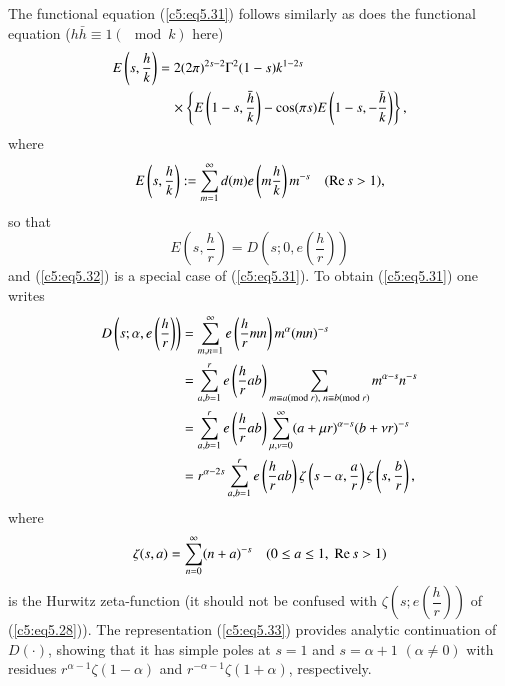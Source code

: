 The functional equation (\ref{c5:eq5.31}) follows similarly as does
the functional equation ($h \bar{h} \equiv 1 (\mod k)$ here) 
\begin{align}
E \left(s , \frac{h}{k} \right) &= 2 (2 \pi)^{2s - 2} \Gamma^2 (1-s)
k^{1-2s}\notag\\
&\quad \times \left\{ E \left(1-s, \frac{\bar{h}}{k} \right) - \cos
(\pi s) E \left(1-s, - \frac{\bar{h}}{k} \right)\right\},
\label{c5:eq5.32} 
\end{align}
where
$$
E \left(s, \frac{h}{k} \right) : = \sum\limits^\infty_{m=1} d(m) e
\left(m\frac{h}{k} \right) m^{-s} \quad (\operatorname{Re} s > 1),  
$$
so that
$$
E \left(s, \frac{h}{r} \right) = D \left(s; 0, e \left(\frac{h}{r}
\right) \right)  
$$
and (\ref{c5:eq5.32}) is a special case of (\ref{c5:eq5.31}). To
obtain (\ref{c5:eq5.31}) one writes  
\begin{align}
 D \left(s; \alpha, e \left(\frac{h}{r} \right) \right) & =
 \sum\limits^\infty_{m,n=1} e \left(\frac{h}{r}mn \right) m^{\alpha}
 (mn)^{-s} \label{c5:eq5.33}\\ 
&= \sum\limits^r_{a,b=1} e \left(\frac{h}{r} ab \right)
 \sum\limits_{m \equiv a (\text{mod } r) , \; n \equiv b (\text{mod }
   r)} m^{\alpha -s } n^{-s }\notag\\ 
& = \sum\limits^r_{a,b=1} e \left(\frac{h}{r} ab \right)
 \sum\limits^\infty_{\mu, \nu=0} (a+ \mu r)^{\alpha-s} (b+ \nu r
 )^{-s}\notag\\ 
& = r^{\alpha -2s} \sum\limits^r_{a,b=1} e \left(\frac{h}{r} ab
 \right) \zeta \left(s-\alpha, \frac{a}{r} \right) \zeta \left(s,
 \frac{b}{r} \right),\notag 
\end{align}\pageoriginale
where 
$$
 \zeta(s,a) = \sum\limits^\infty_{n=0} (n+a)^{-s} \quad (0 \leq a
 \leq 1, \;  \operatorname{Re} s > 1) 
$$
is the Hurwitz zeta-function (it should not be confused with $\zeta
\left(s; e \left(\dfrac{h}{r} \right) \right)$ of
(\ref{c5:eq5.28})). The representation (\ref{c5:eq5.33}) provides
analytic continuation of $D(\cdot)$, showing that it has simple poles
at $s=1$ and $s = \alpha +1$ $(\alpha\neq 0)$ with residues $r^{\alpha
  - 1} \zeta(1-\alpha)$ and $r^{-\alpha -1} \zeta(1+\alpha)$,
respectively. 

